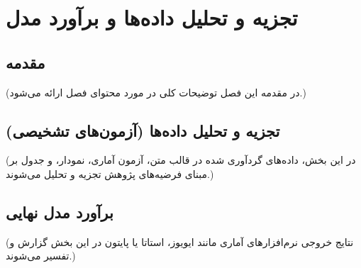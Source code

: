 \chapter{تجزیه و تحلیل داده‌ها و برآورد مدل}

\section{مقدمه}
(در مقدمه این فصل توضیحات کلی در مورد محتوای فصل ارائه می‌شود.)

\section{تجزیه و تحلیل داده‌ها (آزمون‌های تشخیصی)}
(در این بخش، داده‌های گردآوری شده در قالب متن، آزمون آماری، نمودار، و جدول بر مبنای فرضیه‌های پژوهش تجزیه و تحلیل می‌شوند.)

\section{برآورد مدل نهایی}
(نتایج خروجی نرم‌افزارهای آماری مانند ایویوز، استاتا یا پایتون در این بخش گزارش و تفسیر می‌شوند.)